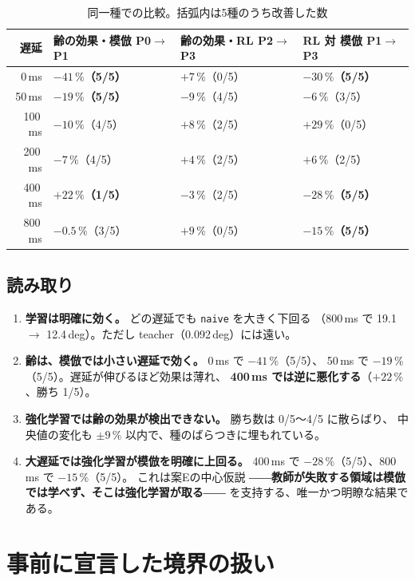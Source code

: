 \documentclass[11pt,a4paper]{article}
\newcommand{\code}[1]{\texttt{#1}}
\newcommand{\prob}[1]{\textbf{\textcolor{red!55!black}{#1}}}
\newcommand{\keyp}[1]{\textbf{\textcolor{blue!45!black}{#1}}}
\begin{document}
\begin{table}[htbp]
\centering
\small
\caption{同一種での比較。括弧内は5種のうち改善した数}
\label{tab:paired}
\begin{tabular}{@{}r lll@{}}
\toprule
\textbf{遅延} & \textbf{齢の効果・模倣 P0$\to$P1} & \textbf{齢の効果・RL P2$\to$P3} &
\textbf{RL 対 模倣 P1$\to$P3} \\
\midrule
0\,ms   & \keyp{$-41\,\%$（5/5）} & $+7\,\%$（0/5） & \keyp{$-30\,\%$（5/5）} \\
50\,ms  & \keyp{$-19\,\%$（5/5）} & $-9\,\%$（4/5） & $-6\,\%$（3/5） \\
100\,ms & $-10\,\%$（4/5） & $+8\,\%$（2/5） & $+29\,\%$（0/5） \\
200\,ms & $-7\,\%$（4/5） & $+4\,\%$（2/5） & $+6\,\%$（2/5） \\
400\,ms & \prob{$+22\,\%$（1/5）} & $-3\,\%$（2/5） & \keyp{$-28\,\%$（5/5）} \\
800\,ms & $-0.5\,\%$（3/5） & $+9\,\%$（0/5） & \keyp{$-15\,\%$（5/5）} \\
\bottomrule
\end{tabular}
\end{table}

\subsection{読み取り}

\begin{enumerate}[leftmargin=1.8em,itemsep=4pt]
  \item \keyp{学習は明確に効く。} どの遅延でも \code{naive} を大きく下回る
        （800\,ms で 19.1 $\to$ 12.4\,deg）。ただし teacher（0.092\,deg）には遠い。
  \item \keyp{齢は、模倣では小さい遅延で効く。} 0\,ms で $-41\,\%$（5/5）、
        50\,ms で $-19\,\%$（5/5）。遅延が伸びるほど効果は薄れ、
        \prob{400\,ms では逆に悪化する}（$+22\,\%$、勝ち 1/5）。
  \item \prob{強化学習では齢の効果が検出できない。} 勝ち数は 0/5〜4/5 に散らばり、
        中央値の変化も $\pm 9\,\%$ 以内で、種のばらつきに埋もれている。
  \item \keyp{大遅延では強化学習が模倣を明確に上回る。}
        400\,ms で $-28\,\%$（5/5）、800\,ms で $-15\,\%$（5/5）。
        これは案Eの中心仮説 ――\keyp{教師が失敗する領域は模倣では学べず、そこは強化学習が取る}――
        を支持する、唯一かつ明瞭な結果である。
\end{enumerate}

\section{事前に宣言した境界の扱い}
\end{document}
